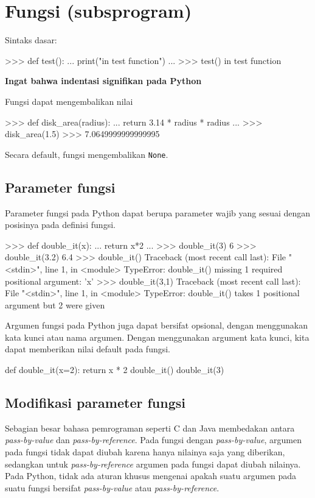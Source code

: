 \section{Fungsi (subsprogram)}

Sintaks dasar:
\begin{pyconcode}
>>> def test():
...     print("in test function")
...
>>> test()
in test function
\end{pyconcode}

\textbf{Ingat bahwa indentasi signifikan pada Python}

Fungsi dapat mengembalikan nilai
\begin{pyconcode}
>>> def disk_area(radius):
...     return 3.14 * radius * radius
...
>>> disk_area(1.5)
>>> 7.0649999999999995
\end{pyconcode}

Secara default, fungsi mengembalikan \texttt{None}.

\subsection{Parameter fungsi}

Parameter fungsi pada Python dapat berupa parameter wajib yang sesuai
dengan posisinya pada definisi fungsi.

\begin{pyconcode}
>>> def double_it(x):
...     return x*2
... 
>>> double_it(3)
6
>>> double_it(3.2)
6.4
>>> double_it()
Traceback (most recent call last):
  File "<stdin>", line 1, in <module>
TypeError: double_it() missing 1 required positional argument: 'x'
>>> double_it(3,1)
Traceback (most recent call last):
  File "<stdin>", line 1, in <module>
TypeError: double_it() takes 1 positional argument but 2 were given
\end{pyconcode}

Argumen fungsi pada Python juga dapat bersifat
opsional, dengan menggunakan kata kunci atau nama argumen.
Dengan menggunakan argument kata kunci, kita dapat memberikan nilai
default pada fungsi.
\begin{pythoncode}
def double_it(x=2):
    return x * 2
double_it()
double_it(3)
\end{pythoncode}


\subsection{Modifikasi parameter fungsi}

Sebagian besar bahasa pemrograman seperti C dan Java membedakan antara
\textit{pass-by-value} dan \textit{pass-by-reference}.
Pada fungsi dengan \textit{pass-by-value}, argumen pada fungsi tidak dapat
diubah karena hanya nilainya saja yang diberikan, sedangkan untuk
\textit{pass-by-reference} argumen pada fungsi dapat diubah nilainya.
Pada Python, tidak ada aturan khusus mengenai apakah suatu argumen pada suatu
fungsi bersifat \textit{pass-by-value} atau \textit{pass-by-reference}.

